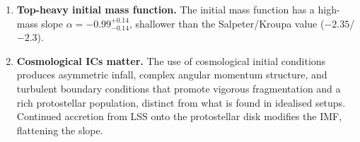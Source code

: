 \documentclass[twocolumn]{openjournal}
\begin{document}
\begin{enumerate}
	\item \textbf{Top-heavy initial mass function.}
	      The initial mass function has a high-mass slope
	      $\alpha = -0.99^{+0.14}_{-0.14}$, shallower than the
	      Salpeter/Kroupa value ($-2.35$/$-2.3$).

	\item \textbf{Cosmological ICs matter.}
	      The use of cosmological initial conditions produces asymmetric
	      infall, complex angular momentum structure, and turbulent
	      boundary conditions that promote vigorous fragmentation and
	      a rich protostellar population, distinct from what is found in
	      idealised setups. Continued accretion from LSS onto the protostellar disk
	      modifies the IMF, flattening the slope.
\end{enumerate}




\end{document}
